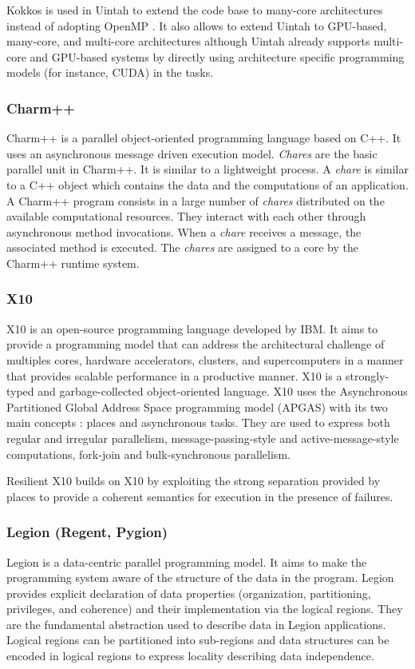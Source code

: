 Kokkos \cite{CarTS2014} is used in Uintah to extend the code base to many-core architectures instead of adopting OpenMP \cite{HPHSD2019}.
It also allows to extend Uintah to  GPU-based, many-core, and multi-core architectures although Uintah already supports  multi-core and GPU-based systems by directly using architecture specific programming models (for instance, CUDA) in the tasks.

\subsubsection{Charm++}
Charm++ \cite{KaleK1993} \cite{RobBK2016} is a parallel object-oriented programming language based on C++.
It uses an asynchronous message driven execution model.
\textit{Chares} are the basic parallel unit in Charm++.
It is similar to a lightweight process.
A \textit{chare} is similar to a C++ object which contains the data and the computations of an application.
A Charm++ program consists in a large number of \textit{chares} distributed on the available computational resources.
They interact with each other through asynchronous method invocations.
When a \textit{chare} receives a message, the associated method is executed.
The \textit{chares} are assigned to a core by the Charm++ runtime system.

\subsubsection{X10}
X10 \cite{CGSDK2005} is an open-source programming language developed by IBM.
It aims to provide a programming model that can address the architectural challenge of multiples cores, hardware accelerators, clusters, and supercomputers in a manner that provides scalable performance in a productive manner.
X10 is a strongly-typed and garbage-collected object-oriented language.
X10 uses the Asynchronous Partitioned Global Address Space programming model (APGAS) with its two main concepts :  places and asynchronous tasks.
They are used to express both regular and irregular parallelism, message-passing-style and active-message-style computations, fork-join and bulk-synchronous parallelism.

Resilient X10 \cite{HHMGT2016}  \cite{GHHIK2019} builds on X10 by exploiting the strong separation provided by places to provide a coherent semantics for execution in the presence of failures.

\subsubsection{Legion (Regent, Pygion)}
Legion \cite{BaTSA2012} is a data-centric parallel programming model.
It aims to make the programming system aware of the structure of the data in the program.
Legion provides explicit declaration of data properties (organization, partitioning, privileges, and coherence) and their implementation via the logical regions.
They are the fundamental abstraction used to describe data in Legion applications.
Logical regions can be partitioned into sub-regions and data structures can be encoded in logical regions to express locality describing data independence.

